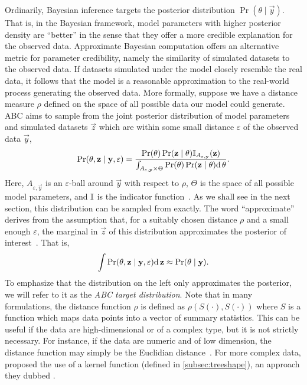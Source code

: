 Ordinarily, Bayesian inference targets the posterior distribution $\Pr(\theta
\mid \vec{y})$. That is, in the Bayesian framework, model parameters with
higher posterior density are ``better'' in the sense that they offer a more
credible explanation for the observed data. Approximate Bayesian computation
offers an alternative metric for parameter credibility, namely the similarity
of simulated datasets to the observed data. If datasets simulated under the
model closely resemble the real data, it follows that the model is a reasonable
approximation to the real-world process generating the observed data. More
formally, suppose we have a distance measure $\rho$ defined on the space of all
possible data our model could generate. \gls{ABC} aims to sample from the joint
posterior distribution of model parameters and simulated datasets $\vec{z}$
which are within some small distance $\varepsilon$ of the observed data
$\vec{y}$,
\[
  \Pr(\theta, \mathbf{z} \mid \mathbf{y}, \varepsilon) =
  \frac{\Pr(\theta) \Pr(\mathbf{z} \mid \theta) \mathbb{I}_{A_{\varepsilon, \mathbf{y}}} (\mathbf{z})}
  {\int_{A_{\varepsilon, \mathbf{y}} \times \Theta} \Pr(\theta) \Pr(\mathbf{z} \mid \theta) \mathrm{d}\, \theta}.
\]
Here, $A_{\varepsilon, \vec{y}}$ is an $\varepsilon$-ball around $\vec{y}$ with
respect to $\rho$, $\Theta$ is the space of all possible model parameters, and
$\mathbb{I}$ is the indicator function~\autocite{marin2012approximate}. As we shall
see in the next section, this distribution can be sampled from exactly. The
word ``approximate'' derives from the assumption that, for a suitably chosen
distance $\rho$ and a small enough $\varepsilon$, the marginal in $\vec{z}$ of
this distribution approximates the posterior of
interest~\autocite{marin2012approximate}. That is,
\[
  \int \Pr(\theta, \mathbf{z} \mid \mathbf{y}, \varepsilon) \mathrm{d}\,\mathbf{z}
  \approx \Pr(\theta \mid \mathbf{y}).
\]
To emphasize that the distribution on the left only approximates the posterior,
we will refer to it as the \textit{\gls{ABC} target distribution}. Note that in
many formulations, the distance function $\rho$ is defined as $\rho(S(\cdot),
S(\cdot))$ where $S$ is a function which maps data points into a vector of
summary statistics. This can be useful if the data are high-dimensional or of a
complex type, but it is not strictly necessary. For instance, if the data are
numeric and of low dimension, the distance function may simply be the Euclidian
distance~\autocite{sisson2007sequential}. For more complex data,
\textcite{nakagome2013kernel} proposed the use of a kernel function (defined in
\cref{subsec:treeshape}), an approach they dubbed .

